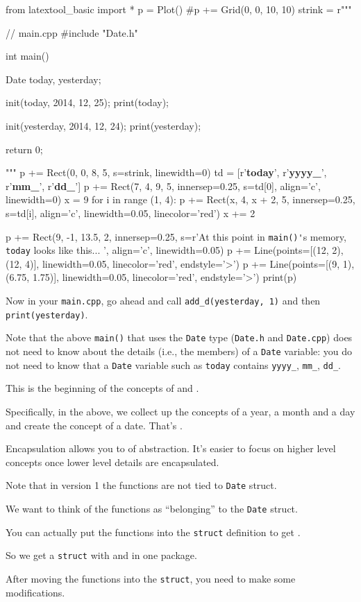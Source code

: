 \begin{python}
from latextool_basic import *
p = Plot()
#p += Grid(0, 0, 10, 10)
strink = r"""
\begin{consolethree}[escapeinside=||]
// main.cpp
#include "Date.h"

int main()
{
    Date today, yesterday;

    init(today, 2014, 12, 25);
    print(today);
    
    init(yesterday, 2014, 12, 24);
    print(yesterday);

    return 0;
}
\end{consolethree}
"""
p += Rect(0, 0, 8, 5, s=strink, linewidth=0)
td = [r'\textbf{today}', r'\textbf{yyyy\_}', r'\textbf{mm\_}', r'\textbf{dd\_}']
p += Rect(7, 4, 9, 5, innersep=0.25, s=td[0], align='c', linewidth=0)
x = 9
for i in range (1, 4):
      p += Rect(x, 4, x + 2, 5, innersep=0.25, s=td[i], align='c', linewidth=0.05, linecolor='red')
      x += 2

p += Rect(9, -1, 13.5, 2, innersep=0.25, s=r'At this point in \texttt{main()\'}s memory, \texttt{today} looks like this... ', align='c', linewidth=0.05)
p += Line(points=[(12, 2), (12, 4)], linewidth=0.05, linecolor='red', endstyle='>')
p += Line(points=[(9, 1), (6.75, 1.75)], linewidth=0.05, linecolor='red', endstyle='>')
print(p)
\end{python}

Now in your \texttt{main.cpp}, go ahead and call \texttt{add\_d(yesterday,
1)} and then \texttt{print(yesterday)}.

Note that the above \texttt{main()} that uses the \texttt{Date} type
(\texttt{Date.h} and \texttt{Date.cpp}) does not need to know about the
details (i.e., the members) of a \texttt{Date} variable: you do not need
to know that a \texttt{Date} variable such as \texttt{today} contains
\texttt{yyyy\_}, \texttt{mm\_}, \texttt{dd\_}.

This is the beginning of the concepts of  and
.

Specifically, in the above, we collect up the concepts of a year, a
month and a day and create the concept of a date. That's
.

Encapsulation allows you to  of
abstraction. It's easier to focus on higher level
concepts once lower level details are encapsulated.

Note that in version 1 the functions are not tied to \texttt{Date} struct.

We want to think of the functions as ``belonging'' to the \texttt{Date}
struct.

You can actually put the functions into the \texttt{struct} definition to
get  .

So we get a \texttt{struct} with  and
 in one package.

After moving the functions into the \texttt{struct}, you need to make some
modifications.



